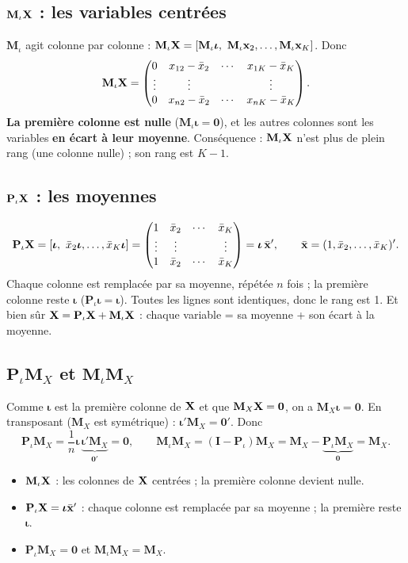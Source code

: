 \documentclass[11pt,a4paper]{article}
\newcommand{\vi}{\bm{\iota}}
\newcommand{\I}{\mathbf{I}}\newcommand{\J}{\mathbf{J}}
\newcommand{\Pm}{\mathbf{P}}\newcommand{\Mm}{\mathbf{M}}
\begin{document}
\subsection*{$\Mm_\iota\vX$ : les variables centrées}
$\Mm_\iota$ agit colonne par colonne : $\Mm_\iota\vX=[\Mm_\iota\vi,\ \Mm_\iota\vx_2,\dots,\Mm_\iota\vx_K]$. Donc
\[
\Mm_\iota\vX=\begin{pmatrix}0&x_{12}-\bar x_2&\cdots&x_{1K}-\bar x_K\\\vdots&\vdots&&\vdots\\0&x_{n2}-\bar x_2&\cdots&x_{nK}-\bar x_K\end{pmatrix}.
\]
\textbf{La première colonne est nulle} ($\Mm_\iota\vi=\mathbf 0$), et les autres colonnes sont les variables \textbf{en écart à leur moyenne}. Conséquence : $\Mm_\iota\vX$ n'est plus de plein rang (une colonne nulle) ; son rang est $K-1$.

\subsection*{$\Pm_\iota\vX$ : les moyennes}
\[
\Pm_\iota\vX=[\vi,\ \bar x_2\vi,\dots,\bar x_K\vi]=\begin{pmatrix}1&\bar x_2&\cdots&\bar x_K\\\vdots&\vdots&&\vdots\\1&\bar x_2&\cdots&\bar x_K\end{pmatrix}=\vi\,\bar{\vx}',\qquad \bar{\vx}=(1,\bar x_2,\dots,\bar x_K)' .
\]
Chaque colonne est remplacée par sa moyenne, répétée $n$ fois ; la première colonne reste $\vi$ ($\Pm_\iota\vi=\vi$). Toutes les lignes sont identiques, donc le rang est 1. Et bien sûr $\vX=\Pm_\iota\vX+\Mm_\iota\vX$ : chaque variable = sa moyenne + son écart à la moyenne.

\subsection*{$\Pm_\iota\Mm_X$ et $\Mm_\iota\Mm_X$}

Comme $\vi$ est la première colonne de $\mathbf{X}$ et que $\Mm_X\vX=\mathbf 0$, on a $\Mm_X\vi=\mathbf 0$. En transposant ($\Mm_X$ est symétrique) : $\vi'\Mm_X=\mathbf 0'$. Donc
\[
\Pm_\iota\Mm_X=\frac1n\vi\,\underbrace{\vi'\Mm_X}_{\mathbf 0'}=\mathbf 0,
\qquad
\Mm_\iota\Mm_X=(\I-\Pm_\iota)\Mm_X=\Mm_X-\underbrace{\Pm_\iota\Mm_X}_{\mathbf 0}=\Mm_X .
\]

\begin{reponse}
\begin{itemize}[nosep]
\item $\Mm_\iota\vX$ : les colonnes de $\mathbf{X}$ centrées ; la première colonne devient nulle.
\item $\Pm_\iota\vX=\vi\bar{\vx}'$ : chaque colonne est remplacée par sa moyenne ; la première reste $\vi$.
\item $\Pm_\iota\Mm_X=\mathbf 0$ \quad et \quad $\Mm_\iota\Mm_X=\Mm_X$.
\end{itemize}
\end{reponse}
\end{document}
